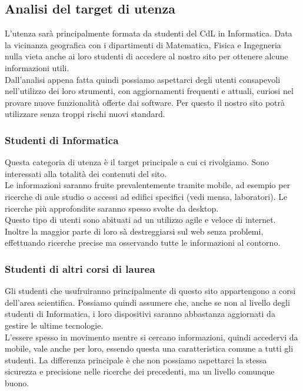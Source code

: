 \subsection{Analisi del target di utenza}

L'utenza sarà principalmente formata da studenti del CdL in Informatica. Data la vicinanza geografica con i dipartimenti di Matematica, Fisica e Ingegneria nulla vieta anche ai loro studenti di accedere al nostro sito per ottenere alcune informazioni utili.\\
Dall'analisi appena fatta quindi possiamo aspettarci degli utenti consapevoli nell'utilizzo dei loro strumenti, con aggiornamenti frequenti e attuali, curiosi nel provare nuove funzionalità offerte dai software. Per questo il nostro sito potrà utilizzare senza troppi rischi nuovi standard.

\subsubsection{Studenti di Informatica}
Questa categoria di utenza è il target principale a cui ci rivolgiamo. Sono interessati alla totalità dei contenuti del sito. \\
Le informazioni saranno fruite prevalentemente tramite mobile, ad esempio per ricerche di aule studio o accessi ad edifici specifici (vedi mensa, laboratori). Le ricerche più approfondite saranno spesso svolte da desktop.\\
Questo tipo di utenti sono abituati ad un utilizzo agile e veloce di internet. Inoltre la maggior parte di loro sà destreggiarsi sul web senza problemi, effettuando ricerche precise ma osservando tutte le informazioni al contorno.

\subsubsection{Studenti di altri corsi di laurea}
Gli studenti che usufruiranno principalmente di questo sito appartengono a corsi dell'area scientifica. Possiamo quindi assumere che, anche se non al livello degli studenti di Informatica, i loro dispositivi saranno abbastanza aggiornati da gestire le ultime tecnologie.\\
L'essere spesso in movimento mentre si cercano informazioni, quindi accedervi da mobile, vale anche per loro, essendo questa una caratteristica comune a tutti gli studenti. La differenza principale è che non possiamo aspettarci la stessa sicurezza e precisione nelle ricerche dei precedenti, ma un livello comunque buono.

